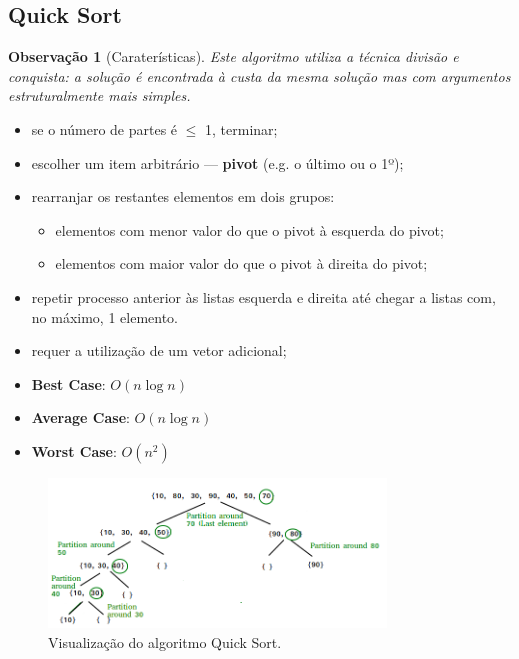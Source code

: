 \documentclass[a4paper, 12pt]{article}
\newtheorem{remark}{Observação}
\begin{document}
\subsection{Quick Sort}
\begin{remark}[Caraterísticas]
    Este algoritmo utiliza a técnica divisão e conquista: a solução é encontrada à custa da mesma solução mas com argumentos estruturalmente mais simples.\end{remark}
    \begin{itemize}
        \item se o número de partes é $\leq$ 1, terminar;
        \item escolher um item arbitrário — \textbf{pivot} (e.g. o último ou o 1º);
        \item rearranjar os restantes elementos em dois grupos:
        \begin{itemize}
            \item elementos com menor valor do que o pivot à esquerda do pivot;
            \item elementos com maior valor do que o pivot à direita do pivot;
        \end{itemize}
        \item repetir processo anterior às listas esquerda e direita até chegar a listas com, no máximo, 1 elemento.
    \end{itemize}
    \begin{itemize}
        \item requer a utilização de um vetor adicional;
        \item \textbf{Best Case}: $O(n\log n)$
        \item \textbf{Average Case}: $O(n\log n)$
        \item \textbf{Worst Case}: $O(n^2)$
    \end{itemize}
\begin{center}
    \begin{figure}[H]
        \centering
        \includegraphics[width=0.8\textwidth]{fig/ao/qs.png}
        \caption{Visualização do algoritmo Quick Sort.}
    \end{figure}
\end{center}
\end{document}
